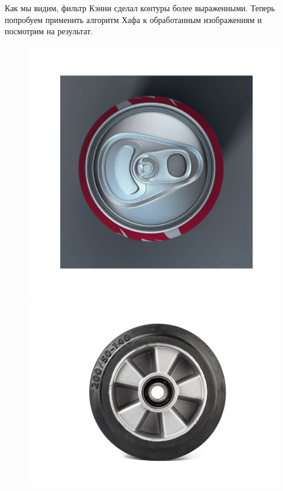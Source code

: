 \documentclass[a4paper,12pt]{article}
\begin{document}
\noindent Как мы видим, фильтр Кэнни сделал контуры более выраженными. Теперь попробуем применить алгоритм Хафа к обработанным изображениям и посмотрим на результат.

\begin{figure}[H]
    \centering
    \begin{minipage}{0.48\textwidth}
        \centering
        \includegraphics[width=\textwidth]{images/hough_circles/1_proc_fixed.png}
    \end{minipage}
    \begin{minipage}{0.48\textwidth}
        \centering
        \includegraphics[width=\textwidth]{images/hough_circles/3_proc_fixed.png}

\end{minipage}
\end{figure}
\end{document}
